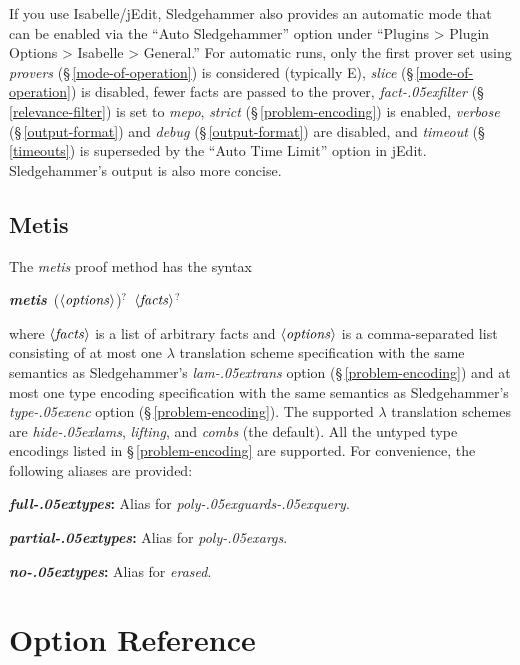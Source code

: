 \documentclass[a4paper,12pt]{article}
\let\oldS=\S
\def\S{\oldS\,}
\def\qty#1{\ensuremath{\left<\mathit{#1\/}\right>}}
\renewcommand\_{\hbox{\textunderscore\kern-.05ex}}
\begin{document}
If you use Isabelle/jEdit, Sledgehammer also provides an automatic mode that can
be enabled via the ``Auto Sledgehammer'' option under ``Plugins > Plugin Options
> Isabelle > General.'' For automatic runs, only the first prover set using
\textit{provers} (\S\ref{mode-of-operation}) is considered (typically E),
\textit{slice} (\S\ref{mode-of-operation}) is disabled,
fewer facts are
passed to the prover, \textit{fact\_filter} (\S\ref{relevance-filter}) is set to
\textit{mepo}, \textit{strict} (\S\ref{problem-encoding}) is enabled,
\textit{verbose} (\S\ref{output-format}) and \textit{debug}
(\S\ref{output-format}) are disabled, and \textit{timeout} (\S\ref{timeouts}) is
superseded by the ``Auto Time Limit'' option in jEdit. Sledgehammer's output is
also more concise.

\subsection{Metis}
\label{metis}

The \textit{metis} proof method has the syntax

\prew
\textbf{\textit{metis}}~(\qty{options})${}^?$~\qty{facts}${}^?$
\postw

where \qty{facts} is a list of arbitrary facts and \qty{options} is a
comma-separated list consisting of at most one $\lambda$ translation scheme
specification with the same semantics as Sledgehammer's \textit{lam\_trans}
option (\S\ref{problem-encoding}) and at most one type encoding specification
with the same semantics as Sledgehammer's \textit{type\_enc} option
(\S\ref{problem-encoding}).
%
The supported $\lambda$ translation schemes are \textit{hide\_lams},
\textit{lifting}, and \textit{combs} (the default).
%
All the untyped type encodings listed in \S\ref{problem-encoding} are supported.
For convenience, the following aliases are provided:
\begin{enum}
\item[\labelitemi] \textbf{\textit{full\_types}:} Alias for \textit{poly\_guards\_query}.
\item[\labelitemi] \textbf{\textit{partial\_types}:} Alias for \textit{poly\_args}.
\item[\labelitemi] \textbf{\textit{no\_types}:} Alias for \textit{erased}.
\end{enum}

\section{Option Reference}
\label{option-reference}
\end{document}
